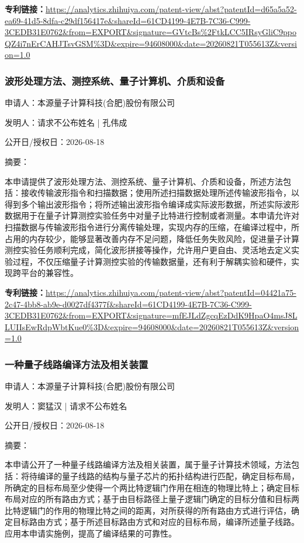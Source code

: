 \documentclass[12pt,a4paper]{ctexart}
\begin{document}
\noindent\textbf{专利链接：}\url{https://analytics.zhihuiya.com/patent-view/abst?patentId=d65a5a52-ea69-41d5-8dfa-c29df156417e&shareId=61CD4199-4E7B-7C36-C999-3CEDB31E0762&from=EXPORT&signature=GVtcBs%2FtkLCC5IRsyGliC9ppoQZ4i7nErCAHJTsvGSM%3D&expire=94608000&date=20260821T055613Z&version=1.0}

\subsubsection{ 波形处理方法、测控系统、量子计算机、介质和设备 }

申请人：本源量子计算科技(合肥)股份有限公司

发明人：请求不公布姓名 | 孔伟成

公开日/授权日：2026-08-18

摘要：

本申请提供了波形处理方法、测控系统、量子计算机、介质和设备，所述方法包括：接收传输波形指令和扫描数据；使用所述扫描数据处理所述传输波形指令，以得到多个输出波形指令；将所述输出波形指令编译成实际波形数据，所述实际波形数据用于在量子计算测控实验任务中对量子比特进行控制或者测量。本申请允许对扫描数据与传输波形指令进行分离传输处理，实现内存的压缩，在编译过程中，所占用的内存较少，能够显著改善内存不足问题，降低任务失败风险，促进量子计算测控实验任务顺利完成，简化波形拼接等操作，允许用户更自由、灵活地去定义实验过程，不仅压缩量子计算测控实验的传输数据量，还有利于解耦实验和硬件，实现跨平台的兼容性。

\noindent\textbf{专利链接：}\url{https://analytics.zhihuiya.com/patent-view/abst?patentId=04421a75-2c47-4bb8-ab9e-d0027df4377f&shareId=61CD4199-4E7B-7C36-C999-3CEDB31E0762&from=EXPORT&signature=mfEJLdZgcqEzDdK9HpaO4msJ8LLUIIsEwRdpWbtKue0%3D&expire=94608000&date=20260821T055613Z&version=1.0}

\subsubsection{ 一种量子线路编译方法及相关装置 }

申请人：本源量子计算科技(合肥)股份有限公司

发明人：窦猛汉 | 请求不公布姓名

公开日/授权日：2026-08-18

摘要：

本申请公开了一种量子线路编译方法及相关装置，属于量子计算技术领域，方法包括：将待编译的量子线路的结构与量子芯片的拓扑结构进行匹配，确定目标布局，所确定的目标布局至少使得一个两比特逻辑门作用在相连的物理比特上；确定目标布局对应的所有路由方式；基于由目标路径上量子逻辑门确定的目标分值和目标两比特逻辑门的作用的物理比特之间的距离，对所获得的所有路由方式进行评估，确定目标路由方式；基于所述目标路由方式和对应的目标布局，编译所述量子线路。应用本申请实施例，提高了编译结果的可靠性。
\end{document}
